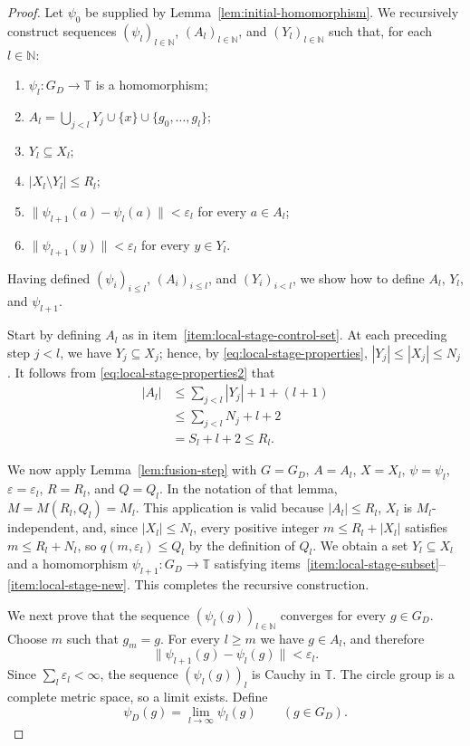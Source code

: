 \documentclass[11pt]{amsart}
\theoremstyle{definition}
\newcommand{\T}{\mathbb T}
\newcommand{\N}{\mathbb N}
\begin{document}
\begin{proof}
Let $\psi_0$ be supplied by Lemma~\ref{lem:initial-homomorphism}.  We
recursively construct sequences $(\psi_l)_{l\in\N}$, $(A_l)_{l\in\N}$, and
$(Y_l)_{l\in\N}$ such that, for each $l\in\N$:
\begin{enumerate}
    \item\label{item:local-stage-homomorphism}
    $\psi_l:G_D\to\T$ is a homomorphism;
    \item\label{item:local-stage-control-set}
    $A_l=\bigcup_{j<l}Y_j\cup\{x\}\cup\{g_0,\ldots,g_l\}$;
    \item\label{item:local-stage-subset}
    $Y_l\subseteq X_l$;
    \item\label{item:local-stage-deletion}
    $|X_l\setminus Y_l|\leq R_l$;
    \item\label{item:local-stage-old}
    $\|\psi_{l+1}(a)-\psi_l(a)\|<\varepsilon_l$ for every $a\in A_l$;
    \item\label{item:local-stage-new}
    $\|\psi_{l+1}(y)\|<\varepsilon_l$ for every $y\in Y_l$.
\end{enumerate}
Having defined $(\psi_i)_{i\leq l}$, $(A_i)_{i\leq l}$, and
$(Y_i)_{i<l}$, we show how to define $A_l$, $Y_l$, and $\psi_{l+1}$.

Start by defining $A_l$ as in item~\ref{item:local-stage-control-set}.
At each preceding step
$j<l$, we have $Y_j\subseteq X_j$; hence, by
\eqref{eq:local-stage-properties}, $|Y_j|\leq |X_j|\leq N_j$.
It follows from \eqref{eq:local-stage-properties2} that
\begin{align*}
 |A_l|
 &\leq \sum_{j<l}|Y_j|+1+(l+1)\\
 &\leq \sum_{j<l}N_j+l+2\\
 &=S_l+l+2\leq R_l.
\end{align*}

We now apply Lemma~\ref{lem:fusion-step} with
$G=G_D$, $A=A_l$, $X=X_l$, $\psi=\psi_l$,
$\varepsilon=\varepsilon_l$, $R=R_l$, and $Q=Q_l$.  In the notation of
that lemma, $M=M(R_l,Q_l)=M_l$.  This application is valid because
$|A_l|\leq R_l$, $X_l$ is $M_l$-independent, and, since
$|X_l|\leq N_l$, every positive integer $m\leq R_l+|X_l|$ satisfies
$m\leq R_l+N_l$, so $q(m,\varepsilon_l)\leq Q_l$ by the definition of
$Q_l$.  We obtain a set
$Y_l\subseteq X_l$ and a homomorphism
$\psi_{l+1}:G_D\to\T$ satisfying
items~\ref{item:local-stage-subset}--\ref{item:local-stage-new}.  This
completes the recursive construction.

We next prove that the sequence $(\psi_l(g))_{l\in\N}$ converges for
every $g\in G_D$.  Choose $m$ such that $g_m=g$.  For every $l\geq m$
we have $g\in A_l$, and therefore
\[
 \|\psi_{l+1}(g)-\psi_l(g)\|<\varepsilon_l.
\]
Since $\sum_l\varepsilon_l<\infty$, the sequence
$(\psi_l(g))_l$ is Cauchy in $\T$.  The circle group is a complete metric
space, so a limit exists.  Define
\[
 \psi_D(g)=\lim_{l\to\infty}\psi_l(g)
 \qquad(g\in G_D).
\]


\end{proof}
\end{document}
